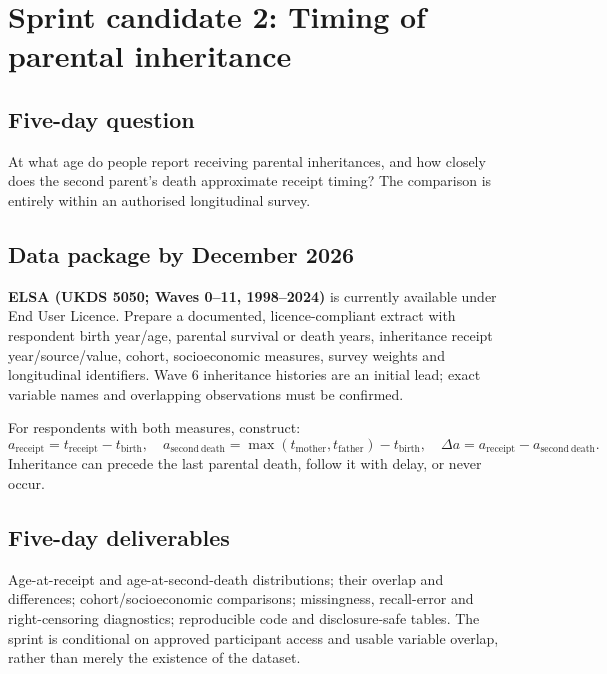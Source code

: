 \section{Sprint candidate 2: Timing of parental inheritance}
\label{sec:timing}

\subsection{Five-day question}
At what age do people report receiving parental inheritances, and how closely does the second parent's death approximate receipt timing? The comparison is entirely within an authorised longitudinal survey.

\subsection{Data package by December 2026}
\textbf{ELSA (UKDS 5050; Waves 0--11, 1998--2024)} is currently available under End User Licence. Prepare a documented, licence-compliant extract with respondent birth year/age, parental survival or death years, inheritance receipt year/source/value, cohort, socioeconomic measures, survey weights and longitudinal identifiers. Wave 6 inheritance histories are an initial lead; exact variable names and overlapping observations must be confirmed.

For respondents with both measures, construct:
\[
a_{\mathrm{receipt}}=t_{\mathrm{receipt}}-t_{\mathrm{birth}},
\quad
a_{\mathrm{second\ death}}=\max(t_{\mathrm{mother}},t_{\mathrm{father}})-t_{\mathrm{birth}},
\quad
\Delta a=a_{\mathrm{receipt}}-a_{\mathrm{second\ death}}.
\]
Inheritance can precede the last parental death, follow it with delay, or never occur.

\subsection{Five-day deliverables}
Age-at-receipt and age-at-second-death distributions; their overlap and differences; cohort/socioeconomic comparisons; missingness, recall-error and right-censoring diagnostics; reproducible code and disclosure-safe tables. The sprint is conditional on approved participant access and usable variable overlap, rather than merely the existence of the dataset.

